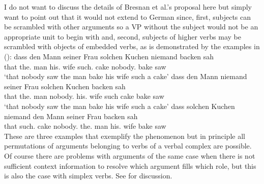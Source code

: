 I do not want to discuss the details of Bresnan et al.'s proposal here but simply want
to point out that it would not extend to German since, first, subjects can be scrambled with other
arguments so a VP without the subject would not be an appropriate unit to begin with and, second,
subjects of higher verbs may be scrambled with objects of embedded verbs, as is demonstrated by the
examples in ():
\eal
\ex 
\gll dass den Mann       seiner Frau     solchen Kuchen niemand backen sah\\
     that the.\acc{} man his.\dat{} wife such.\acc{} cake nobody.\nom{} bake saw\\
\glt `that nobody saw the man bake his wife such a cake'
\ex 
\gll dass den        Mann niemand seiner Frau solchen Kuchen backen sah\\
     that the.\acc{} man  nobody.\nom{} his.\dat{} wife such cake bake saw\\
\glt `that nobody saw the man bake his wife such a cake'
\ex
\gll dass solchen Kuchen niemand den Mann seiner Frau backen sah\\
     that such.\acc{} cake nobody.\nom{} the.\acc{} man his.\dat{} wife bake saw\\
\zl
These are three examples that exemplify the phenomenon but in principle all permutations of
arguments belonging to verbs of a verbal complex are possible. Of course there are problems with
arguments of the same case when there is not sufficient context information to resolve which
argument fills which role, but this is also the case with simplex verbs. See  for discussion.
  
